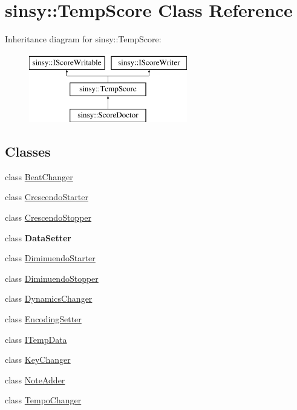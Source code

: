 \hypertarget{classsinsy_1_1TempScore}{\section{sinsy\-:\-:\-Temp\-Score \-Class \-Reference}
\label{classsinsy_1_1TempScore}
}
\-Inheritance diagram for sinsy\-:\-:\-Temp\-Score\-:\begin{figure}[H]
\begin{center}
\leavevmode
\includegraphics[height=3.000000cm]{classsinsy_1_1TempScore}
\end{center}
\end{figure}
\subsection*{\-Classes}
\begin{DoxyCompactItemize}
\item 
class \hyperlink{classsinsy_1_1TempScore_1_1BeatChanger}{\-Beat\-Changer}
\item 
class \hyperlink{classsinsy_1_1TempScore_1_1CrescendoStarter}{\-Crescendo\-Starter}
\item 
class \hyperlink{classsinsy_1_1TempScore_1_1CrescendoStopper}{\-Crescendo\-Stopper}
\item 
class {\bfseries \-Data\-Setter}
\item 
class \hyperlink{classsinsy_1_1TempScore_1_1DiminuendoStarter}{\-Diminuendo\-Starter}
\item 
class \hyperlink{classsinsy_1_1TempScore_1_1DiminuendoStopper}{\-Diminuendo\-Stopper}
\item 
class \hyperlink{classsinsy_1_1TempScore_1_1DynamicsChanger}{\-Dynamics\-Changer}
\item 
class \hyperlink{classsinsy_1_1TempScore_1_1EncodingSetter}{\-Encoding\-Setter}
\item 
class \hyperlink{classsinsy_1_1TempScore_1_1ITempData}{\-I\-Temp\-Data}
\item 
class \hyperlink{classsinsy_1_1TempScore_1_1KeyChanger}{\-Key\-Changer}
\item 
class \hyperlink{classsinsy_1_1TempScore_1_1NoteAdder}{\-Note\-Adder}
\item 
class \hyperlink{classsinsy_1_1TempScore_1_1TempoChanger}{\-Tempo\-Changer}
\end{DoxyCompactItemize}
